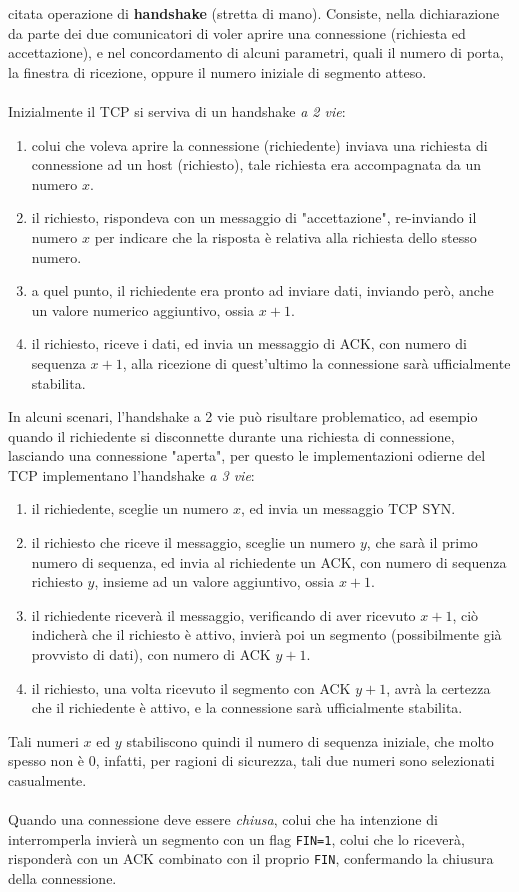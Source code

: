 \documentclass[12pt, letterpaper]{article}
\newcommand{\code}[1]{\colorbox{light-gray}{\texttt{#1}}}
\newcommand{\acc}{\\\hphantom{}\\}
\begin{document}
citata operazione di \textbf{handshake} (stretta di mano). Consiste, nella dichiarazione da parte dei due comunicatori
di voler aprire una connessione (richiesta ed accettazione), e nel concordamento di alcuni parametri, quali il
numero di porta, la finestra di ricezione, oppure il numero iniziale di segmento atteso.\acc
Inizialmente il TCP si serviva di un handshake \textit{a 2 vie}:\begin{enumerate}
    \item
          colui che voleva aprire la connessione (richiedente)
          inviava una richiesta di connessione ad un host (richiesto), tale richiesta era accompagnata da un numero
          $x$.     \item  il richiesto, rispondeva con un messaggio di "accettazione", re-inviando il numero $x$ per indicare
          che la risposta è relativa alla richiesta dello stesso numero.
    \item a quel punto, il richiedente era pronto ad inviare dati, inviando però, anche un valore numerico aggiuntivo,
          ossia $x+1$.
    \item il richiesto, riceve i dati, ed invia un messaggio di ACK, con numero di sequenza $x+1$, alla ricezione di quest'ultimo
          la connessione sarà ufficialmente stabilita.
\end{enumerate}
In alcuni scenari, l'handshake a 2 vie può risultare problematico, ad esempio quando il richiedente si disconnette
durante una richiesta di connessione, lasciando una connessione "aperta", per questo le implementazioni odierne del TCP
implementano l'handshake \textit{a 3 vie}:\begin{enumerate}
    \item il richiedente, sceglie un numero $x$, ed invia un messaggio TCP SYN.
    \item il richiesto che riceve il messaggio, sceglie un numero $y$, che sarà il primo numero di
          sequenza, ed invia al richiedente un ACK, con numero di sequenza richiesto $y$, insieme ad un valore aggiuntivo,
          ossia $x+1$.
    \item il richiedente riceverà il messaggio, verificando di aver ricevuto $x+1$, ciò indicherà che il
          richiesto è attivo, invierà poi un segmento (possibilmente
          già provvisto di dati), con numero di ACK $y+1$.
    \item il richiesto, una volta ricevuto il segmento con ACK $y+1$, avrà la certezza che il richiedente è attivo,
          e la connessione sarà ufficialmente stabilita.
\end{enumerate}
Tali numeri $x$ ed $y$ stabiliscono quindi il numero di sequenza iniziale, che molto spesso non è 0, infatti,
per ragioni di sicurezza,  tali due numeri sono selezionati casualmente.\acc
Quando una connessione deve essere \textit{chiusa}, colui che ha intenzione di interromperla invierà un segmento
con un flag \code{FIN=1}, colui che lo riceverà, risponderà con un ACK combinato con il proprio \code{FIN},
confermando la chiusura della connessione.
\end{document}
